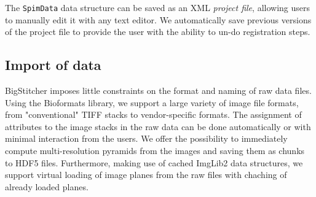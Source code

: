 The \texttt{SpimData} data structure can be saved as an XML \emph{project file}, allowing users to manually edit it with any text editor. We automatically save previous versions of the project file to provide the user with the ability to un-do registration steps.

\subsection*{Import of data}

BigStitcher imposes little constraints on the format and naming of raw data files. Using the Bioformats \cite{bioformats} library, we support a large variety of image file formats, from "conventional" TIFF stacks to vendor-specific formats. The assignment of attributes to the image stacks in the raw data can be done automatically or with minimal interaction from the users. We offer the possibility to immediately compute multi-resolution pyramids from the images and saving them as chunks to HDF5 files. Furthermore, making use of cached ImgLib2 data structures, we support virtual loading of image planes from the raw files with chaching of already loaded planes.

\begin{comment}
\subsection{Illumination selection}

When imaging large samples with multiple illumination directions,  a lot of unnecessary images are acquired since typically, only illumination from one direction provides optimal images. We therefore implemented a simple \emph{illumination selection} functionality in BigStitcher. It starts by \emph{combining} all (selected) images by their \texttt{Illumination} attribute, i.e. it groups images that share all other attributes besides \texttt{Illumination}. In each of the resulting groups we select a best image. We do this by loading the pixel data for all images in the group at the lowest resolution level (in the case of non-multiresolution images, this corresponds to the original image) and calculating a \emph{quality metric}. We currently offer mean intensity and mean gradient magnitude as quality metrics. The image with the highest score is kept, while all other images are marked as \emph{missing} in the \texttt{SpimData}, which will lead to them being ignored in subsequent processing steps. 
\end{comment}

